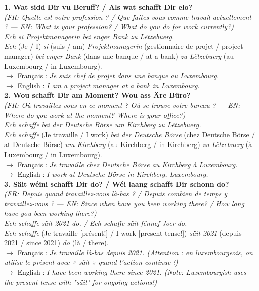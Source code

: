 \noindent\textbf{1. Wat sidd Dir vu Beruff? / Als wat schafft Dir elo?}\\
\textit{(FR: Quelle est votre profession ? / Que faites-vous comme travail actuellement ? — EN: What is your profession? / What do you do for work currently?)}\\[0.3em]
\textit{Ech si Projektmanagerin bei enger Bank zu Lëtzebuerg.}\\
\textit{Ech} (Je / I) \textit{si} (suis / am) \textit{Projektmanagerin} (gestionnaire de projet / project manager) \textit{bei enger Bank} (dans une banque / at a bank) \textit{zu Lëtzebuerg} (au Luxembourg / in Luxembourg).\\
$\rightarrow$ Français : \textit{Je suis chef de projet dans une banque au Luxembourg.}\\
$\rightarrow$ English : \textit{I am a project manager at a bank in Luxembourg.}\\[0.8em]

\noindent\textbf{2. Wou schafft Dir am Moment? Wou ass Äre Büro?}\\
\textit{(FR: Où travaillez-vous en ce moment ? Où se trouve votre bureau ? — EN: Where do you work at the moment? Where is your office?)}\\[0.3em]
\textit{Ech schaffe bei der Deutsche Börse um Kirchberg zu Lëtzebuerg.}\\
\textit{Ech schaffe} (Je travaille / I work) \textit{bei der Deutsche Börse} (chez Deutsche Börse / at Deutsche Börse) \textit{um Kirchberg} (au Kirchberg / in Kirchberg) \textit{zu Lëtzebuerg} (à Luxembourg / in Luxembourg).\\
$\rightarrow$ Français : \textit{Je travaille chez Deutsche Börse au Kirchberg à Luxembourg.}\\
$\rightarrow$ English : \textit{I work at Deutsche Börse in Kirchberg, Luxembourg.}\\[0.8em]

\noindent\textbf{3. Säit wéini schafft Dir do? / Wéi laang schafft Dir schonn do?}\\
\textit{(FR: Depuis quand travaillez-vous là-bas ? / Depuis combien de temps y travaillez-vous ? — EN: Since when have you been working there? / How long have you been working there?)}\\[0.3em]
\textit{Ech schaffe säit 2021 do. / Ech schaffe säit fënnef Joer do.}\\
\textit{Ech schaffe} (Je travaille [présent!] / I work [present tense!]) \textit{säit 2021} (depuis 2021 / since 2021) \textit{do} (là / there).\\
$\rightarrow$ Français : \textit{Je travaille là-bas depuis 2021. (Attention : en luxembourgeois, on utilise le présent avec « säit » quand l'action continue !)}\\
$\rightarrow$ English : \textit{I have been working there since 2021. (Note: Luxembourgish uses the present tense with "säit" for ongoing actions!)}\\[0.8em]

